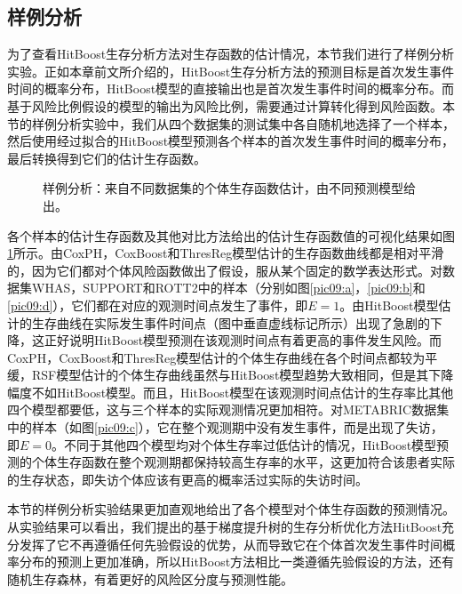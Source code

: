 \subsection{样例分析}

为了查看HitBoost生存分析方法对生存函数的估计情况，本节我们进行了样例分析实验。正如本章前文所介绍的，HitBoost生存分析方法的预测目标是首次发生事件时间的概率分布，HitBoost模型的直接输出也是首次发生事件时间的概率分布。而基于风险比例假设的模型的输出为风险比例，需要通过计算转化得到风险函数。本节的样例分析实验中，我们从四个数据集的测试集中各自随机地选择了一个样本，然后使用经过拟合的HitBoost模型预测各个样本的首次发生事件时间的概率分布，最后转换得到它们的估计生存函数。
\begin{figure}[h]
\centering 
{}
\hspace{0.01\linewidth}
\vfill
{}
\hspace{0.01\linewidth}
\caption{样例分析：来自不同数据集的个体生存函数估计，由不同预测模型给出。}
\label{pic09}
\end{figure}

各个样本的估计生存函数及其他对比方法给出的估计生存函数值的可视化结果如图\ref{pic09}所示。由CoxPH，CoxBoost和ThresReg模型估计的生存函数曲线都是相对平滑的，因为它们都对个体风险函数做出了假设，服从某个固定的数学表达形式。对数据集WHAS，SUPPORT和ROTT2中的样本（分别如图\ref{pic09:a}，\ref{pic09:b}和\ref{pic09:d}），它们都在对应的观测时间点发生了事件，即$E=1$。由HitBoost模型估计的生存曲线在实际发生事件时间点（图中垂直虚线标记所示）出现了急剧的下降，这正好说明HitBoost模型预测在该观测时间点有着更高的事件发生风险。而CoxPH，CoxBoost和ThresReg模型估计的个体生存曲线在各个时间点都较为平缓，RSF模型估计的个体生存曲线虽然与HitBoost模型趋势大致相同，但是其下降幅度不如HitBoost模型。而且，HitBoost模型在该观测时间点估计的生存率比其他四个模型都要低，这与三个样本的实际观测情况更加相符。对METABRIC数据集中的样本（如图\ref{pic09:c}），它在整个观测期中没有发生事件，而是出现了失访，即$E=0$。不同于其他四个模型均对个体生存率过低估计的情况，HitBoost模型预测的个体生存函数在整个观测期都保持较高生存率的水平，这更加符合该患者实际的生存状态，即失访个体应该有更高的概率活过实际的失访时间。 

本节的样例分析实验结果更加直观地给出了各个模型对个体生存函数的预测情况。从实验结果可以看出，我们提出的基于梯度提升树的生存分析优化方法HitBoost充分发挥了它不再遵循任何先验假设的优势，从而导致它在个体首次发生事件时间概率分布的预测上更加准确，所以HitBoost方法相比一类遵循先验假设的方法，还有随机生存森林，有着更好的风险区分度与预测性能。

